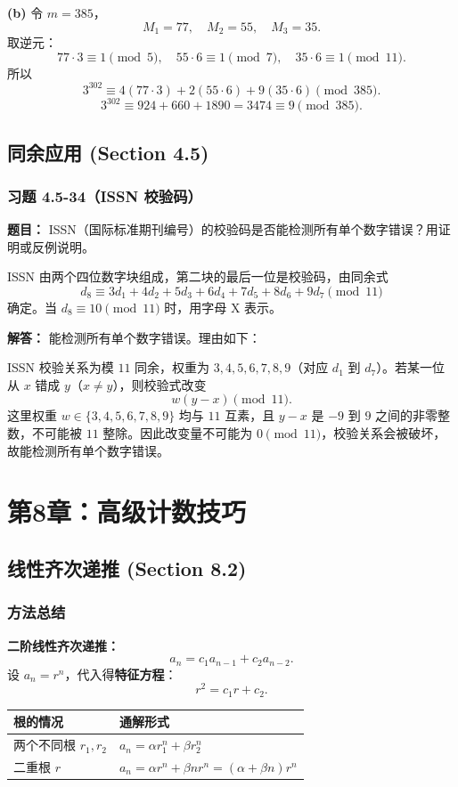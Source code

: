 \documentclass[11pt,UTF8]{article}
\begin{document}
\textbf{(b)} 令 $m=385$，
\[ M_1=77,\quad M_2=55,\quad M_3=35. \]
取逆元：
\[ 77\cdot 3\equiv 1\pmod 5,\quad 55\cdot 6\equiv 1\pmod 7,\quad 35\cdot 6\equiv 1\pmod{11}. \]
所以
\[ 3^{302} \equiv 4(77\cdot 3)+2(55\cdot 6)+9(35\cdot 6) \pmod{385}. \]
\[ 3^{302} \equiv 924+660+1890 = 3474 \equiv \boxed{9\pmod{385}}. \]



\subsection{同余应用 (Section 4.5)}

\subsubsection*{习题 4.5-34（ISSN 校验码）}
\textbf{题目：} ISSN（国际标准期刊编号）的校验码是否能检测所有单个数字错误？用证明或反例说明。

ISSN 由两个四位数字块组成，第二块的最后一位是校验码，由同余式
\[ d_8 \equiv 3d_1+4d_2+5d_3+6d_4+7d_5+8d_6+9d_7 \pmod{11} \]
确定。当 $d_8\equiv 10\pmod{11}$ 时，用字母 X 表示。

\textbf{解答：} 能检测所有单个数字错误。理由如下：

ISSN 校验关系为模 $11$ 同余，权重为 $3,4,5,6,7,8,9$（对应 $d_1$ 到 $d_7$）。若某一位从 $x$ 错成 $y$（$x\neq y$），则校验式改变
\[ w(y-x)\pmod{11}. \]
这里权重 $w\in\{3,4,5,6,7,8,9\}$ 均与 $11$ 互素，且 $y-x$ 是 $-9$ 到 $9$ 之间的非零整数，不可能被 $11$ 整除。因此改变量不可能为 $0\pmod{11}$，校验关系会被破坏，故能检测所有单个数字错误。



\newpage
\section{第8章：高级计数技巧}

\subsection{线性齐次递推 (Section 8.2)}

\subsubsection*{方法总结}

\textbf{二阶线性齐次递推：}
\[ a_n = c_1 a_{n-1} + c_2 a_{n-2}. \]
设 $a_n=r^n$，代入得\textbf{特征方程}：
\[ r^2 = c_1 r + c_2. \]

\begin{center}
\begin{tabular}{l|l}
\hline
根的情况 & 通解形式 \\
\hline
两个不同根 $r_1,r_2$ & $a_n = \alpha r_1^n + \beta r_2^n$ \\
二重根 $r$ & $a_n = \alpha r^n + \beta n r^n = (\alpha+\beta n)r^n$ \\
\hline
\end{tabular}
\end{center}
\end{document}
